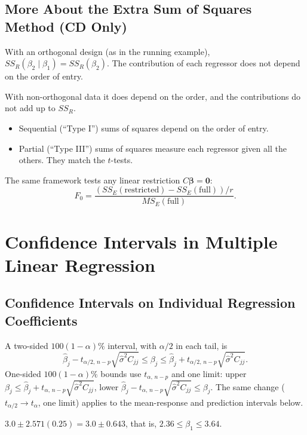 \subsection{More About the Extra Sum of Squares Method (CD Only)}

With an orthogonal design (as in the running example), $SS_R(\beta_2\mid\beta_1)=SS_R(\beta_2)$. The contribution of each regressor does not depend on the order of entry.

With non-orthogonal data it does depend on the order, and the contributions do not add up to $SS_R$.
\begin{itemize}
  \item Sequential (``Type I'') sums of squares depend on the order of entry.
  \item Partial (``Type III'') sums of squares measure each regressor given all the others. They match the $t$-tests.
\end{itemize}
The same framework tests any linear restriction $C\boldsymbol\beta=\mathbf{0}$:
\[ F_0=\frac{(SS_E(\text{restricted})-SS_E(\text{full}))/r}{MS_E(\text{full})}. \]

\section{Confidence Intervals in Multiple Linear Regression}

\subsection{Confidence Intervals on Individual Regression Coefficients}

\begin{theorem}\label{thm:mlr-ci}
A two-sided $100(1-\alpha)\%$ interval, with $\alpha/2$ in each tail, is
\[ \hat\beta_j-t_{\alpha/2,\,n-p}\sqrt{\hat\sigma^2C_{jj}}\le\beta_j\le\hat\beta_j+t_{\alpha/2,\,n-p}\sqrt{\hat\sigma^2C_{jj}}. \]
One-sided $100(1-\alpha)\%$ bounds use $t_{\alpha,\,n-p}$ and one limit: upper $\beta_j\le\hat\beta_j+t_{\alpha,\,n-p}\sqrt{\hat\sigma^2C_{jj}}$, lower $\hat\beta_j-t_{\alpha,\,n-p}\sqrt{\hat\sigma^2C_{jj}}\le\beta_j$. The same change ($t_{\alpha/2}\to t_\alpha$, one limit) applies to the mean-response and prediction intervals below.
\end{theorem}

\begin{example}
$3.0\pm2.571(0.25)=3.0\pm0.643$, that is, $2.36\le\beta_1\le3.64$.
\end{example}

